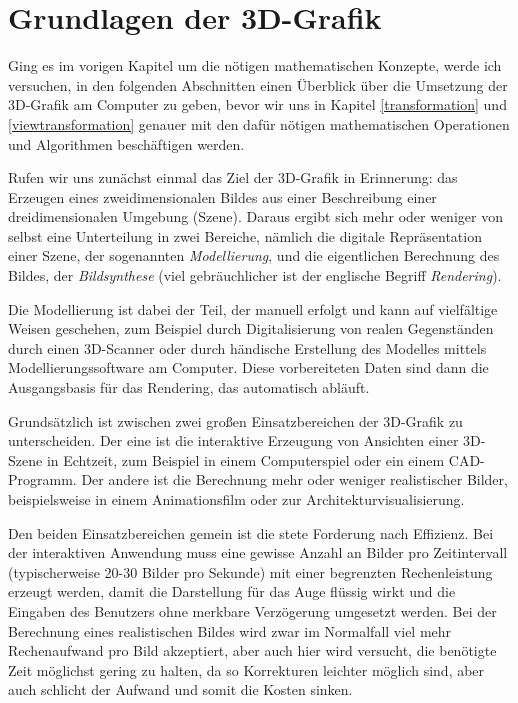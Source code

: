 \chapter{Grundlagen der 3D-Grafik}
Ging es im vorigen Kapitel um die nötigen mathematischen Konzepte, werde ich versuchen, in den folgenden Abschnitten einen Überblick über die Umsetzung der 3D-Grafik am Computer zu geben, bevor wir uns in Kapitel \ref{transformation} und \ref{viewtransformation} genauer mit den dafür nötigen mathematischen Operationen und Algorithmen beschäftigen werden.

Rufen wir uns zunächst einmal das Ziel der 3D-Grafik in Erinnerung: das Erzeugen eines zweidimensionalen Bildes aus einer Beschreibung einer dreidimensionalen Umgebung (Szene). Daraus ergibt sich mehr oder weniger von selbst eine Unterteilung in zwei Bereiche, nämlich die digitale Repräsentation einer Szene, der sogenannten \emph{Modellierung}, und die eigentlichen Berechnung des Bildes, der \emph{Bildsynthese} (viel gebräuchlicher ist der englische Begriff \emph{Rendering}).

Die Modellierung ist dabei der Teil, der manuell erfolgt und kann auf vielfältige Weisen geschehen, zum Beispiel durch Digitalisierung von realen Gegenständen durch einen 3D-Scanner oder durch händische Erstellung des Modelles mittels Modellierungssoftware am Computer. Diese vorbereiteten Daten sind dann die Ausgangsbasis für das Rendering, das automatisch abläuft.

Grundsätzlich ist zwischen zwei großen Einsatzbereichen der 3D-Grafik zu unterscheiden. Der eine ist die interaktive Erzeugung von Ansichten einer 3D-Szene in Echtzeit, zum Beispiel in einem Computerspiel oder ein einem CAD-Programm. Der andere ist die Berechnung mehr oder weniger realistischer Bilder, beispielsweise in einem Animationsfilm oder zur Architekturvisualisierung.

Den beiden Einsatzbereichen gemein ist die stete Forderung nach Effizienz. Bei der interaktiven Anwendung muss eine gewisse Anzahl an Bilder pro Zeitintervall (typischerweise 20-30 Bilder pro Sekunde) mit einer begrenzten Rechenleistung erzeugt werden, damit die Darstellung für das Auge flüssig wirkt und die Eingaben des Benutzers ohne merkbare Verzögerung umgesetzt werden. Bei der Berechnung eines realistischen Bildes wird zwar im Normalfall viel mehr Rechenaufwand pro Bild akzeptiert, aber auch hier wird versucht, die benötigte Zeit möglichst gering zu halten, da so Korrekturen leichter möglich sind, aber auch schlicht der Aufwand und somit die Kosten sinken.

